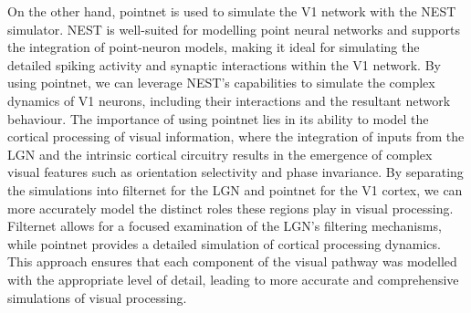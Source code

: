 \documentclass[12pt]{article}
\begin{document}
On the other hand, pointnet is used to simulate the V1 network with the NEST simulator. NEST is well-suited for modelling point neural networks and supports the integration of point-neuron models, making it ideal for simulating the detailed spiking activity and synaptic interactions within the V1 network. By using pointnet, we can leverage NEST's capabilities to simulate the complex dynamics of V1 neurons, including their interactions and the resultant network behaviour. The importance of using pointnet lies in its ability to model the cortical processing of visual information, where the integration of inputs from the LGN and the intrinsic cortical circuitry results in the emergence of complex visual features such as orientation selectivity and phase invariance. By separating the simulations into filternet for the LGN and pointnet for the V1 cortex, we can more accurately model the distinct roles these regions play in visual processing. Filternet allows for a focused examination of the LGN's filtering mechanisms, while pointnet provides a detailed simulation of cortical processing dynamics. This approach ensures that each component of the visual pathway was modelled with the appropriate level of detail, leading to more accurate and comprehensive simulations of visual processing.
\end{document}
